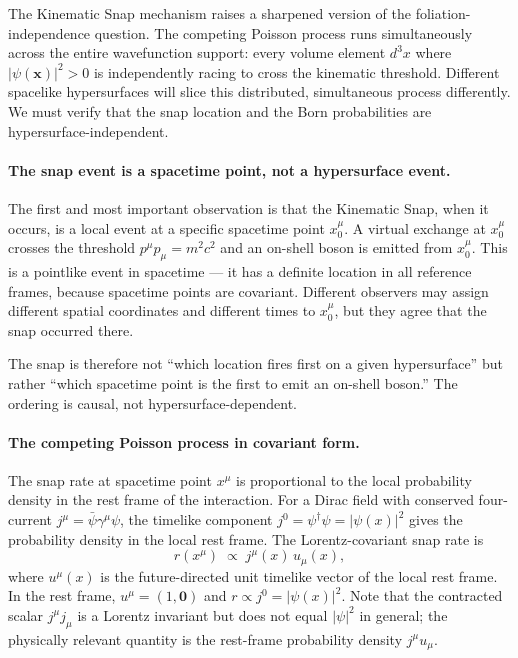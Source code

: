 \documentclass[11pt,a4paper]{article}
\theoremstyle{plain}
\theoremstyle{definition}
\theoremstyle{remark}
\begin{document}
The Kinematic Snap mechanism raises a sharpened version of the
foliation-independence question. The competing Poisson process runs simultaneously
across the entire wavefunction support: every volume element $d^3x$ where
$|\psi(\mathbf{x})|^2 > 0$ is independently racing to cross the kinematic
threshold. Different spacelike hypersurfaces will slice this distributed,
simultaneous process differently. We must verify that the snap location and the
Born probabilities are hypersurface-independent.

\paragraph{The snap event is a spacetime point, not a hypersurface event.}
The first and most important observation is that the Kinematic Snap, when it
occurs, is a local event at a specific spacetime point $x_0^\mu$. A virtual
exchange at $x_0^\mu$ crosses the threshold $p^\mu p_\mu = m^2c^2$ and an
on-shell boson is emitted from $x_0^\mu$. This is a pointlike event in
spacetime --- it has a definite location in all reference frames, because spacetime
points are covariant. Different observers may assign different spatial coordinates
and different times to $x_0^\mu$, but they agree that the snap occurred there.

The snap is therefore not ``which location fires first on a given hypersurface''
but rather ``which spacetime point is the first to emit an on-shell boson.'' The
ordering is causal, not hypersurface-dependent.

\paragraph{The competing Poisson process in covariant form.}
The snap rate at spacetime point $x^\mu$ is proportional to the local probability
density in the rest frame of the interaction. For a Dirac field with conserved
four-current $j^\mu = \bar{\psi}\gamma^\mu\psi$, the timelike component
$j^0 = \psi^\dagger\psi = |\psi(x)|^2$ gives the probability density in the local
rest frame. The Lorentz-covariant snap rate is
\begin{equation}
  r(x^\mu) \;\propto\; j^\mu(x)\,u_\mu(x),
\end{equation}
where $u^\mu(x)$ is the future-directed unit timelike vector of the local rest
frame. In the rest frame, $u^\mu = (1,\mathbf{0})$ and $r \propto j^0 = |\psi(x)|^2$.
Note that the contracted scalar $j^\mu j_\mu$ is a Lorentz invariant but does not
equal $|\psi|^2$ in general; the physically relevant quantity is the rest-frame
probability density $j^\mu u_\mu$.
\end{document}
